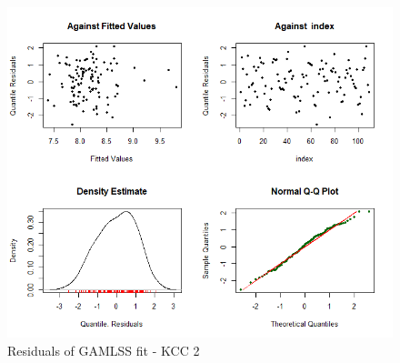 \begin{figure}[H]
\centering
  \includegraphics[width=0.95\linewidth]{figures/gamlss_residuals_kcc_2.png}
  \caption{Residuals of GAMLSS fit - KCC 2}
  \label{fig:gamlss_residuals_kcc_2}
\end{figure}






